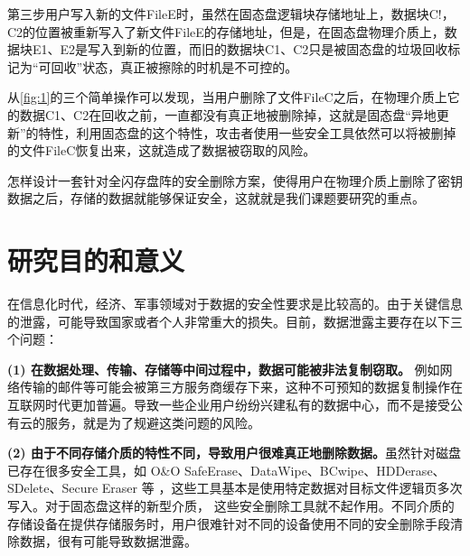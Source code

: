 第三步用户写入新的文件FileE时，虽然在固态盘逻辑块存储地址上，数据块C!，C2的位置被重新写入了新文件FileE的存储地址，但是，在固态盘物理介质上，数据块E1、E2是写入到新的位置，而旧的数据块C1、C2只是被固态盘的垃圾回收标记为“可回收”状态，真正被擦除的时机是不可控的。


从\autoref{fig:1}的三个简单操作可以发现，当用户删除了文件FileC之后，在物理介质上它的数据C1、C2在回收之前，一直都没有真正地被删除掉，这就是固态盘“异地更新”的特性，利用固态盘的这个特性，攻击者使用一些安全工具依然可以将被删掉的文件FileC恢复出来，这就造成了数据被窃取的风险。


怎样设计一套针对全闪存盘阵的安全删除方案，使得用户在物理介质上删除了密钥数据之后，存储的数据就能够保证安全，这就就是我们课题要研究的重点。
\section{研究目的和意义}
在信息化时代，经济、军事领域对于数据的安全性要求是比较高的。由于关键信息的泄露，可能导致国家或者个人非常重大的损失。目前，数据泄露主要存在以下三个问题：


\textbf{(1) 在数据处理、传输、存储等中间过程中，数据可能被非法复制窃取。}
例如网络传输的邮件等可能会被第三方服务商缓存下来，这种不可预知的数据复制操作在互联网时代更加普遍。导致一些企业用户纷纷兴建私有的数据中心，而不是接受公有云的服务，就是为了规避这类问题的风险。


\textbf{(2) 由于不同存储介质的特性不同，导致用户很难真正地删除数据。}虽然针对磁盘已存在很多安全工具，如 O\&O SafeErase、DataWipe、BCwipe、HDDerase、SDelete、Secure Eraser 等\cite{safe-erase,secure-eraser,bcwipe} ，这些工具基本是使用特定数据对目标文件逻辑页多次写入。对于固态盘这样的新型介质， 这些安全删除工具就不起作用。不同介质的存储设备在提供存储服务时，用户很难针对不同的设备使用不同的安全删除手段清除数据，很有可能导致数据泄露。


